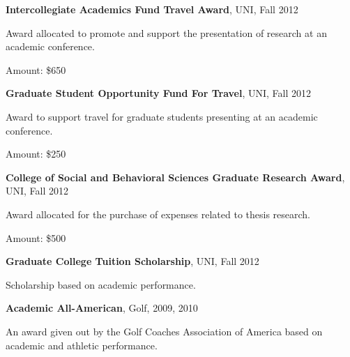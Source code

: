 \documentclass[letterpaper,10pt]{article}
\newlength{\outerbordwidth}
\newcommand{\resheading}[1]{\vspace{8pt}
  \parbox{\textwidth}{\setlength{\FrameSep}{\outerbordwidth}
    \begin{shaded}
\setlength{\fboxsep}{0pt}\framebox[\textwidth][l]{\setlength{\fboxsep}{4pt}\fcolorbox{shadecolorB}{shadecolorB}{\textbf{\sffamily{\mbox{~}\makebox[6.762in][l]{\large #1} \vphantom{p\^{E}}}}}}
    \end{shaded}
  }\vspace{-5pt}
}
\begin{document}
\begin{center}
	\parbox{6.5in}{\textbf{Intercollegiate Academics Fund Travel Award}, UNI, Fall 2012}
	\parbox{6.5in}{Award allocated to promote and support the presentation of research at an academic conference.}
	\parbox{6.5in}{Amount: \$650}
\end{center}
\begin{center}
	\parbox{6.5in}{\textbf{Graduate Student Opportunity Fund For Travel}, UNI, Fall 2012}
	\parbox{6.5in}{Award to support travel for graduate students presenting at an academic conference.}
	\parbox{6.5in}{Amount: \$250}
\end{center}
\begin{center}
	\parbox{6.5in}{\textbf{College of Social and Behavioral Sciences Graduate Research Award}, UNI, Fall 2012}
	\parbox{6.5in}{Award allocated for the purchase of expenses related to thesis research.}
	\parbox{6.5in}{Amount: \$500}
\end{center}
\begin{center}
	\parbox{6.5in}{\textbf{Graduate College Tuition Scholarship}, UNI,  Fall 2012}
	\parbox{6.5in}{Scholarship based on academic performance.}
\end{center}
\begin{center}
	\parbox{6.5in}{\textbf{Academic All-American}, Golf, 2009, 2010}
	\parbox{6.5in}{An award given out by the Golf Coaches Association of America based on academic and athletic performance.}
\end{center}


%
\end{document}
